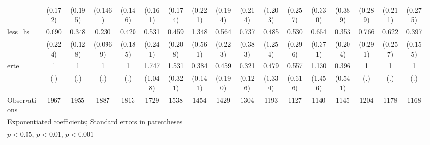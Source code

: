 {\begin{tabular}{l*{16}{c}}
                    &     (0.172)         &     (0.195)         &     (0.146)         &     (0.146)         &     (0.161)         &     (0.174)         &     (0.221)         &     (0.194)         &     (0.214)         &     (0.203)         &     (0.257)         &     (0.330)         &     (0.389)         &     (0.289)         &     (0.211)         &     (0.275)         \\
[1em]
less\_hs             &       0.690         &       0.348\sym{**} &       0.230\sym{***}&       0.420\sym{*}  &       0.531         &       0.459         &       1.348         &       0.564         &       0.737         &       0.485         &       0.530         &       0.654         &       0.353         &       0.766         &       0.622         &       0.397\sym{*}  \\
                    &     (0.224)         &     (0.128)         &    (0.0969)         &     (0.185)         &     (0.241)         &     (0.208)         &     (0.561)         &     (0.223)         &     (0.383)         &     (0.254)         &     (0.296)         &     (0.371)         &     (0.204)         &     (0.291)         &     (0.257)         &     (0.155)         \\
[1em]
erte                &           1         &           1         &           1         &           1         &       1.747         &       1.531\sym{*}  &       0.384\sym{**} &       0.459         &       0.321\sym{**} &       0.479         &       0.557         &       1.130         &       0.396         &           1         &           1         &           1         \\
                    &         (.)         &         (.)         &         (.)         &         (.)         &     (1.048)         &     (0.321)         &     (0.141)         &     (0.190)         &     (0.126)         &     (0.330)         &     (0.616)         &     (1.456)         &     (0.541)         &         (.)         &         (.)         &         (.)         \\
\hline
Observations        &        1967         &        1955         &        1887         &        1813         &        1729         &        1538         &        1454         &        1429         &        1304         &        1193         &        1127         &        1140         &        1145         &        1204         &        1178         &        1168         \\
\hline\hline
\multicolumn{17}{l}{\footnotesize Exponentiated coefficients; Standard errors in parentheses}\\
\multicolumn{17}{l}{\footnotesize \sym{*} \(p<0.05\), \sym{**} \(p<0.01\), \sym{***} \(p<0.001\)}\\
\end{tabular}
}

